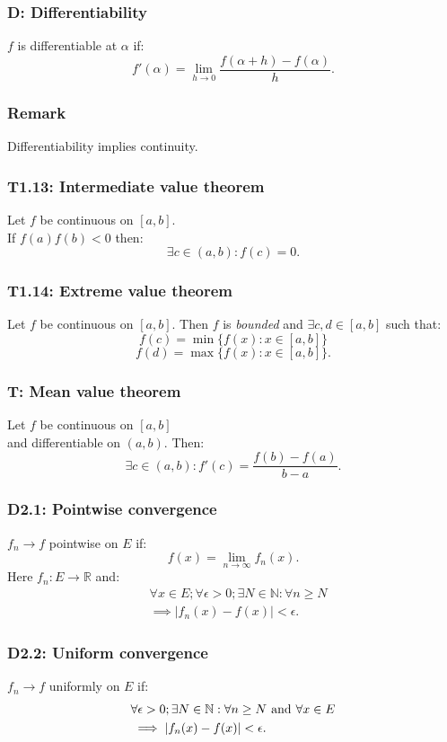 \documentclass{article}
\begin{document}
\begin{multicols*}{3}
\subsubsection*{D: Differentiability}
$f$ is differentiable at $\alpha$ if:
$$f'(\alpha)=\lim_{h\rightarrow0}
\frac{f(\alpha+h)-f(\alpha)}{h}.$$

\subsubsection*{Remark}
Differentiability implies continuity.

\subsubsection*{T1.13: Intermediate value theorem}
Let $f$ be continuous on $[a,b]$. \\
If $f(a)f(b)<0$ then:
$$\exists c\in(a,b):f(c)=0.$$

\subsubsection*{T1.14: Extreme value theorem}
Let $f$ be continuous on $[a,b]$. Then $f$ is \textit{bounded}
and $\exists c,d\in[a,b]$ such that:
$$f(c)=\min\{f(x):x\in[a,b]\}$$
$$f(d)=\max\{f(x):x\in[a,b]\}.$$

\subsubsection*{T: Mean value theorem}
Let $f$ be continuous on $[a,b]$ \\
and differentiable on $(a,b)$.
Then:
$$\exists c\in(a,b):f'(c)=\frac{f(b)-f(a)}{b-a}.$$

\subsubsection*{D2.1: Pointwise convergence}
$f_n\rightarrow f$ pointwise on $E$ if:
$$f(x)=\lim_{n\rightarrow\infty}f_n(x).$$
Here $f_n:E\rightarrow\mathbb{R}$ and:
\begin{align*}
    &\forall x\in E;\forall\epsilon>0;
    \exists N\in\mathbb{N}:\forall n\geq N \\
    &\implies |f_n(x)-f(x)|<\epsilon.
\end{align*}

\subsubsection*{D2.2: Uniform convergence}
$f_n\rightarrow f$ uniformly on $E$ if:
\begin{align*}
    &\forall\epsilon>0;
    \exists N\in\mathbb{N}:\forall n\geq N
    \hspace{0.05in}\text{and}\hspace{0.05in}
    \forall x\in E \\
    &\implies |f_n(x)-f(x)|<\epsilon.
\end{align*}


\end{multicols*}
\end{document}
